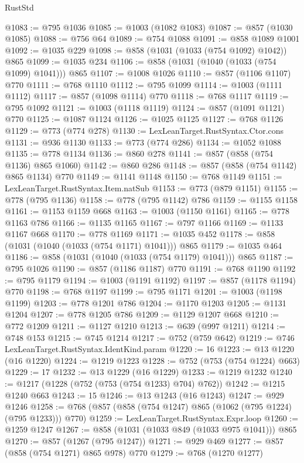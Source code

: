 \begin{lexlean}{RustStd}
\begin{coremodule}
@1083 := @795 @1036
@1085 := @1003 (@1082 @1083)
@1087 := @857 (@1030 @1085)
@1088 := @756 @64
@1089 := @754 @1088
@1091 := @858 @1089 @1001
@1092 := @1035 @229
@1098 := @858 (@1031 (@1033 (@754 @1092) @1042)) @865
@1099 := @1035 @234
@1106 := @858 (@1031 (@1040 (@1033 (@754 @1099) @1041))) @865
@1107 := @1008 @1026
@1110 := @857 (@1106 @1107) @770
@1111 := @768 @1110
@1112 := @795 @1099
@1114 := @1003 (@1111 @1112)
@1117 := @857 (@1098 @1114) @770
@1118 := @768 @1117
@1119 := @795 @1092
@1121 := @1003 (@1118 @1119)
@1124 := @857 (@1091 @1121) @770
@1125 := @1087 @1124
@1126 := @1025 @1125
@1127 := @768 @1126
@1129 := @773 (@774 @278)
@1130 := LexLeanTarget.RustSyntax.Ctor.cons
@1131 := @936 @1130
@1133 := @773 (@774 @286)
@1134 := @1052 @1088
@1135 := @778 @1134
@1136 := @860 @278
@1141 := @857 (@858 (@754 @1136) @865 @1060)
@1142 := @860 @286
@1148 := @857 (@858 (@754 @1142) @865 @1134) @770
@1149 := @1141 @1148
@1150 := @768 @1149
@1151 := LexLeanTarget.RustSyntax.Item.natSub
@1153 := @773 (@879 @1151)
@1155 := @778 (@795 @1136)
@1158 := @778 (@795 @1142) @786
@1159 := @1155 @1158
@1161 := @1153 @1159 @668
@1163 := @1003 (@1150 @1161)
@1165 := @778 @1163 @786
@1166 := @1135 @1165
@1167 := @797 @1166
@1169 := @1133 @1167 @668
@1170 := @778 @1169
@1171 := @1035 @452
@1178 := @858 (@1031 (@1040 (@1033 (@754 @1171) @1041))) @865
@1179 := @1035 @464
@1186 := @858 (@1031 (@1040 (@1033 (@754 @1179) @1041))) @865
@1187 := @795 @1026
@1190 := @857 (@1186 @1187) @770
@1191 := @768 @1190
@1192 := @795 @1179
@1194 := @1003 (@1191 @1192)
@1197 := @857 (@1178 @1194) @770
@1198 := @768 @1197
@1199 := @795 @1171
@1201 := @1003 (@1198 @1199)
@1203 := @778 @1201 @786
@1204 := @1170 @1203
@1205 := @1131 @1204
@1207 := @778 @1205 @786
@1209 := @1129 @1207 @668
@1210 := @772 @1209
@1211 := @1127 @1210
@1213 := @639 (@997 @1211)
@1214 := @748 @153
@1215 := @745 @1214
@1217 := @752 (@759 @642)
@1219 := @746 LexLeanTarget.RustSyntax.IdentKind.param
@1220 := 16
@1223 := @13 @1220 (@16 @1220)
@1224 := @1219 @1223
@1228 := @752 (@753 (@754 @1224) @663)
@1229 := 17
@1232 := @13 @1229 (@16 @1229)
@1233 := @1219 @1232
@1240 := @1217 (@1228 (@752 (@753 (@754 @1233) @704) @762))
@1242 := @1215 @1240 @663
@1243 := 15
@1246 := @13 @1243 (@16 @1243)
@1247 := @929 @1246
@1258 := @768 (@857 (@858 (@754 @1247) @865 (@1062 (@795 @1224) (@795 @1233))) @770)
@1259 := LexLeanTarget.RustSyntax.Expr.loop
@1260 := @1259 @1247
@1267 := @858 (@1031 (@1033 @849 (@1033 @975 @1041))) @865
@1270 := @857 (@1267 (@795 @1247))
@1271 := @929 @469
@1277 := @857 (@858 (@754 @1271) @865 @978) @770
@1279 := @768 (@1270 @1277)

\end{coremodule}
\end{lexlean}
